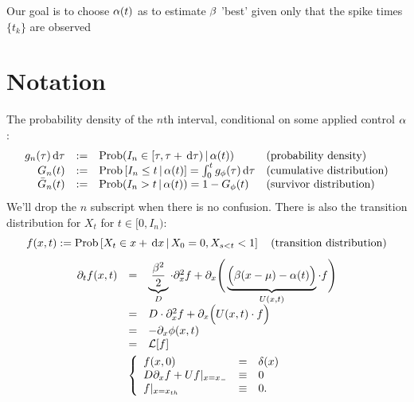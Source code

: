 \documentclass{article}
\begin{document}
Our goal is to choose ${\alpha}(t)$ as to estimate ${\beta}$ 'best' given only that the
spike times $\{t_k\}$ are observed 
 
\section{Notation}
The probability density of the $n$th interval,
conditional on some applied control ${\alpha}$:
\begin{equation} 
\begin{array}{rcll} 
g_n({\tau}) \, \mathrm{d} {\tau} &:=& \operatorname{Prob}(I_{n} \in [{\tau}, {\tau} + \, \mathrm{d} {\tau})  \,|\,
 {\alpha}(t)) &
 \textrm{(probability density)} 
\\ 
G_{n}(t) &:=& \operatorname{Prob} \left[I_{n} \leq t  \,|\,
 {\alpha}(t) \right] = \int_0^t g_{\phi}({\tau}) \, \mathrm{d} {\tau} &
 \textrm{(cumulative distribution)}
\\
{ \bar{G} }_{n}(t) &:= & \operatorname{Prob}(I_{n}>t \,|\, {\alpha}(t) ) = 1 - G_{\phi}(t)
&
 \textrm{(survivor distribution)}
\end{array}
\label{eq:ISI_distribution_functions}
\end{equation}
We'll drop the $n$ subscript when there is no confusion. 
There is also the transition distribution for $X_t$ for $t \in [0,
I_{n})$:
\begin{equation}
f(x,t) := \operatorname{Prob} \left[X_{t} \in x+ \, \mathrm{d} x  \,|\,
 X_0 = 0, X_{s < t} < 1  \right]  \quad
 \textrm{(transition distribution)}
 \label{eq:transition_distribution}
\end{equation} 
\begin{equation}
\begin{gathered}
\begin{array}{lcl}
	{\partial}_t f (x,t) &=&
					\underbrace{\frac{{\beta}^2 }{2}}_{D}\cdot {\partial}^2_x f 
					+ {\partial}_x \Bigg(  
					\underbrace{\Big( {\beta} (x-{\mu }) - {\alpha}(t) \Big)}_{U(x,t)}  \cdot  f \Bigg)
					\\
					&=&
					D \cdot {\partial}^2_x f +
					{\partial}_x  \Big( U(x,t) \cdot f \Big)
					\\
					&=&
					- {\partial}_x \phi(x,t)
					\\
					&=&
					{ \mathcal{L} }[f] 
					\end{array}
	\\
	\left\{ \begin{array}{lcl}
	 f (x,0) &=& \delta(x)
	\\
	D {\partial}_xf + U f |_{x={ x_{-} }} &\equiv& 0 
	\\
	f |_{x={ x_{th} }} &\equiv& 0.
	\end{array} \right.
\label{eq:FP_pde_OU_absorbBC_CDF}
\end{gathered}
\end{equation}
\end{document}
